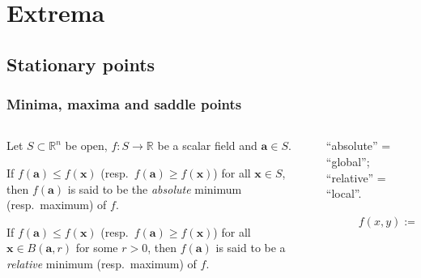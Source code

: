 \documentclass[aspectratio=169,handout]{beamer}
\newcommand{\bR}{\mathbb{R}} %
\renewcommand{\aa}{\mathbf{a}}
\newcommand{\xx}{\mathbf{x}}
\begin{document}
\section{Extrema}

\subsection{Stationary points}

\begin{frame}
    \frametitle{Minima, maxima and saddle points}


    \begin{columns}
        \begin{column}{.5\textwidth}


            Let \(S\subset \bR^n\) be open,
            \(f:S \to \bR\) be a scalar field
            and \(\aa \in S\).

            \begin{definition}
                If \(f(\aa)\leq f(\xx)\) (resp.\ \(f(\aa)\geq f(\xx)\)) for all \(\xx \in S\), then \(f(\aa)\) is said to be the \emph{absolute} minimum (resp.\ maximum) of \(f\).
            \end{definition}

            \begin{definition}
                If \(f(\aa)\leq f(\xx)\) (resp.\ \(f(\aa)\geq f(\xx)\)) for all \(\xx \in B(\aa,r)\) for some \(r>0\), then \(f(\aa)\) is said to be a \emph{relative} minimum (resp.\ maximum) of \(f\).
            \end{definition}
        \end{column}
        \begin{column}{.5\textwidth}
            ``absolute'' = ``global'';
            ``relative'' = ``local''.
            \begin{figure}
                \centering
                \caption{$f(x,y) := x e^{-(x^2y^2)}  + \frac{1}{4}e^{y^\frac{3}{10}}$}
            \end{figure}
        \end{column}
    \end{columns}


\end{frame}
\end{document}
